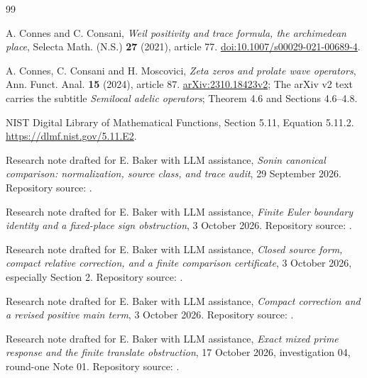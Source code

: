 \documentclass[11pt]{article}
\theoremstyle{remark}
\numberwithin{equation}{section}
\begin{document}
\begin{thebibliography}{99}

A. Connes and C. Consani,
\emph{Weil positivity and trace formula, the archimedean place},
Selecta Math. (N.S.) \textbf{27} (2021), article 77.
\href{https://doi.org/10.1007/s00029-021-00689-4}{doi:10.1007/s00029-021-00689-4}.

A. Connes, C. Consani and H. Moscovici,
\emph{Zeta zeros and prolate wave operators},
Ann. Funct. Anal. \textbf{15} (2024), article 87.
\href{https://arxiv.org/html/2310.18423v2}{arXiv:2310.18423v2};
The arXiv v2 text carries the subtitle \emph{Semilocal adelic operators};
Theorem 4.6 and Sections 4.6--4.8.

NIST Digital Library of Mathematical Functions,
Section 5.11, Equation 5.11.2.
\url{https://dlmf.nist.gov/5.11.E2}.

Research note drafted for E. Baker with LLM assistance,
\emph{Sonin canonical comparison: normalization, source class, and trace audit},
29 September 2026.
Repository source:
.

Research note drafted for E. Baker with LLM assistance,
\emph{Finite Euler boundary identity and a fixed-place sign obstruction},
3 October 2026.
Repository source:
.

Research note drafted for E. Baker with LLM assistance,
\emph{Closed source form, compact relative correction, and a finite comparison certificate},
3 October 2026, especially Section 2.
Repository source:
.

Research note drafted for E. Baker with LLM assistance,
\emph{Compact correction and a revised positive main term},
3 October 2026.
Repository source:
.

Research note drafted for E. Baker with LLM assistance,
\emph{Exact mixed prime response and the finite translate obstruction},
17 October 2026, investigation 04, round-one Note 01.
Repository source:
.


\end{thebibliography}
\end{document}
